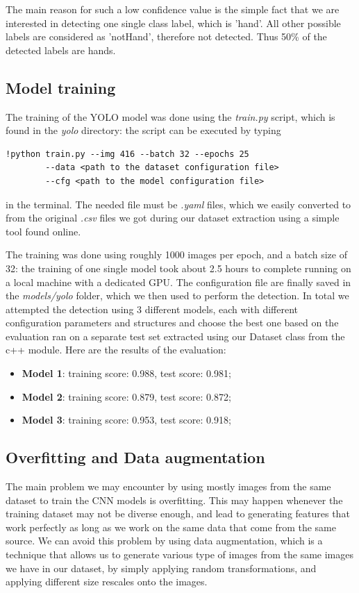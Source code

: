 The main reason for such a low confidence value is the simple fact that we are
interested in detecting one single class label, which is 'hand'. All other
possible labels are considered as
'notHand', therefore not detected. Thus 50\% of the detected labels are hands.

\subsection{Model training}
The training of the YOLO model was done using the \textit{train.py} script, which is found in the \textit{yolo} directory: the script 
can be executed by typing
\begin{lstlisting}[]
    !python train.py --img 416 --batch 32 --epochs 25 
        --data <path to the dataset configuration file> 
        --cfg <path to the model configuration file>
\end{lstlisting} 

in the terminal. The needed file must be \textit{.yaml} files, which we easily converted to from the original \textit{.csv} files 
we got during our dataset extraction using a simple tool found online. 

The training was done using roughly 1000 images per epoch, and a batch size of 32: the training of one single model took about 2.5 hours to complete
running on a local machine with a dedicated GPU. The configuration file are finally saved in the \textit{models/yolo} folder, which we then used 
to perform the detection. In total we attempted the detection using 3 different models, each with different configuration parameters and structures 
and choose the best one based on the evaluation ran on a separate test set extracted using our Dataset class from the c++ module.
Here are the results of the evaluation:
\begin{itemize}
    \item \textbf{Model 1}: training score: 0.988, test score: 0.981;
    \item \textbf{Model 2}: training score: 0.879, test score: 0.872;
    \item \textbf{Model 3}: training score: 0.953, test score: 0.918; 
\end{itemize}

\subsection{Overfitting and Data augmentation}
The main problem we may encounter by using mostly images from the same dataset to train the CNN models is overfitting. This may happen whenever
the training dataset may not be diverse enough, and lead to generating features that work perfectly as long as we work on the same data that come from 
the same source. We can avoid this problem by using data augmentation, which is a technique that allows us to generate various type of images from the 
same images we have in our dataset, by simply applying random transformations, and applying different size rescales onto the images.



